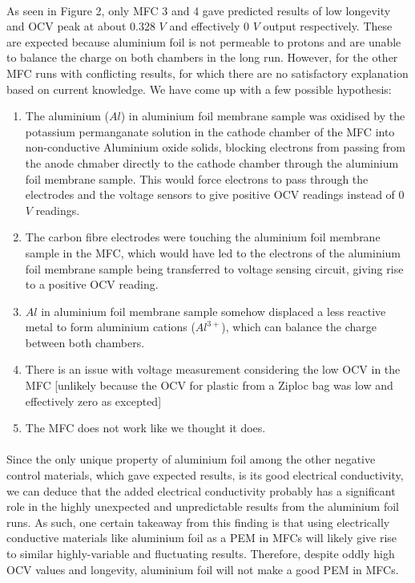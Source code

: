 \documentclass[12pt, twocolumn, a4paper]{article}
\begin{document}
    \paragraph{}As seen in Figure 2, only MFC 3 and 4 gave predicted results of low longevity and OCV peak at about 0.328 $V$ and effectively 0 $V$ output respectively. These are expected because aluminium foil is not permeable to protons and are unable to balance the charge on both chambers in the long run. However, for the other MFC runs with conflicting results, for which there are no satisfactory explanation based on current knowledge. We have come up with a few possible hypothesis: 
    \begin{enumerate}
        \item The aluminium ($Al$) in aluminium foil membrane sample was oxidised by the potassium permanganate solution in the cathode chamber of the MFC into non-conductive Aluminium oxide solids, blocking electrons from passing from the anode chmaber directly to the cathode chamber through the aluminium foil membrane sample. This would force electrons to pass through the electrodes and the voltage sensors to give positive OCV readings instead of 0 $V$ readings.
        \item The carbon fibre electrodes were touching the aluminium foil membrane sample in the MFC, which would have led to the electrons of the aluminium foil membrane sample being transferred to voltage sensing circuit, giving rise to a positive OCV reading.
        \item $Al$ in aluminium foil membrane sample somehow displaced a less reactive metal to form aluminium cations ($Al^{3+}$), which can balance the charge between both chambers. 
        \item There is an issue with voltage measurement considering the low OCV in the MFC [unlikely because the OCV for plastic from a Ziploc bag was low and effectively zero as excepted]
        \item The MFC does not work like we thought it does.
    \end{enumerate}
\paragraph{}Since the only unique property of aluminium foil among the other negative control materials, which gave expected results, is its good electrical conductivity, we can deduce that the added electrical conductivity probably has a significant role in the highly unexpected and unpredictable results from the aluminium foil runs. As such, one certain takeaway from this finding is that using electrically conductive materials like aluminium foil as a PEM in MFCs will likely give rise to similar highly-variable and fluctuating results. Therefore, despite oddly high OCV values and longevity, aluminium foil will not make a good PEM in MFCs. 
\end{document}

